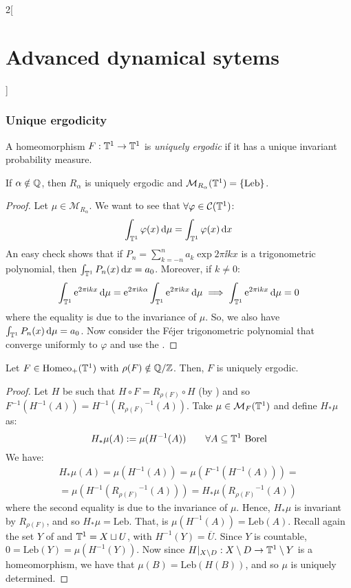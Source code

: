 \documentclass[../../../main_math.tex]{subfiles}
\begin{document}
\begin{multicols}{2}[\section{Advanced dynamical sytems}]
  \subsubsection{Unique ergodicity}
  \begin{definition}
    A homeomorphism $F:\mathbb{T}^1\to\mathbb{T}^1$ is \emph{uniquely ergodic} if it has a unique invariant probability measure.
  \end{definition}
  \begin{lemma}
    If $\alpha\notin \mathbb{Q}$, then $R_\alpha$ is uniquely ergodic and $\mathcal{M}_{R_\alpha}(\mathbb{T}^1)=\{\text{Leb}\}$.
  \end{lemma}
  \begin{proof}
    Let $\mu\in\mathcal{M}_{R_\alpha}$. We want to see that $\forall \varphi\in \mathcal{C}(\mathbb{T}^1)$:
    $$
      \int_{\mathbb{T}^1}\varphi(x)\dd{\mu}=\int_{\mathbb{T}^1}\varphi(x)\dd{x}
    $$
    An easy check shows that if $P_n=\sum_{k=-n}^na_k\exp{2\pi\ii k x}$ is a trigonometric polynomial, then $\int_{\mathbb{T}^1}P_n(x)\dd{x}=a_0$. Moreover, if $k\ne 0$:
    $$
      \int_{\mathbb{T}^1}\mathrm{e}^{2\pi\mathrm{i} kx}\dd{\mu}=\mathrm{e}^{2\pi\mathrm{i} k\alpha}\int_{\mathbb{T}^1}\mathrm{e}^{2\pi\mathrm{i} kx}\dd{\mu}\implies \int_{\mathbb{T}^1}\mathrm{e}^{2\pi\mathrm{i} kx}\dd{\mu}=0
    $$
    where the equality is due to the invariance of $\mu$. So, we also have $\int_{\mathbb{T}^1}P_n(x)\dd{\mu}=a_0$. Now consider the Féjer trigonometric polynomial that converge uniformly to $\varphi$ and use the .
  \end{proof}
  \begin{proposition}\label{ADS:uniquely_ergodic}
    Let $F\in\mathrm{Homeo}_+(\mathbb{T}^1)$ with $\rho(F)\notin\quot{\QQ}{\ZZ}$. Then, $F$ is uniquely ergodic.
  \end{proposition}
  \begin{proof}
    Let $H$ be such that $H\circ F=R_{\rho(F)}\circ H$ (by ) and so $F^{-1}(H^{-1}(A))=H^{-1}({R_{\rho(F)}}^{-1}(A))$. Take $\mu\in\mathcal{M}_F(\mathbb{T}^1)$ and define $H_*\mu$ as:
    $$
      H_*\mu(A):=\mu(H^{-1}(A))\qquad \forall A\subseteq \mathbb{T}^1\text{ Borel}
    $$
    We have:
    \begin{multline*}
      H_*\mu(A)=\mu(H^{-1}(A))=\mu(F^{-1}(H^{-1}(A)))=\\=\mu(H^{-1}({R_{\rho(F)}}^{-1}(A)))=H_*\mu({R_{\rho(F)}}^{-1}(A))
    \end{multline*}
    where the second equality is due to the invariance of $\mu$. Hence, $H_*\mu$ is invariant by $R_{\rho(F)}$, and so $H_*\mu=\text{Leb}$. That, is $\mu(H^{-1}(A))=\text{Leb}(A)$. Recall again the set $Y$ of  and $\mathbb{T}^1=X\sqcup U$, with $H^{-1}(Y)=\overline{U}$. Since $Y$ is countable, $0=\text{Leb}(Y)=\mu(H^{-1}(Y))$. Now since $H|_{X\setminus D}:X\setminus D\to \mathbb{T}^1\setminus Y$ is a homeomorphism, we have that $\mu(B)=\text{Leb}(H(B))$, and so $\mu$ is uniquely determined.

\end{proof}
\end{multicols}
\end{document}
